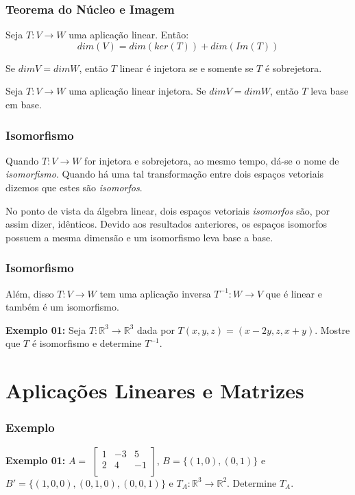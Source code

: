 \documentclass[hyperref={pdfpagelabels=false}]{beamer}
\begin{document}
\begin{frame}
\frametitle{Teorema do Núcleo e Imagem}

\begin{theorem}
	Seja $T:V \rightarrow W$ uma aplicação linear. Então:
	$$dim(V) = dim(ker(T)) + dim(Im(T))$$
\end{theorem}
\pause
\begin{corollary}
	Se $dimV = dimW$, então $T$ linear é injetora se e somente se $T$ é sobrejetora.
\end{corollary}
\pause
\begin{corollary}
	Seja $T:V \rightarrow W$ uma aplicação linear injetora. Se $dimV = dimW$, então $T$ leva base em base.
\end{corollary}

\end{frame}

\begin{frame}
\frametitle{Isomorfismo}

Quando $T: V \rightarrow W$ for injetora e sobrejetora, ao mesmo tempo, dá-se o nome de \emph{isomorfismo}. Quando há uma tal transformação entre dois espaços vetoriais dizemos que estes são \emph{isomorfos}. 

\pause

No ponto de vista da álgebra linear, dois espaços vetoriais \emph{isomorfos} são, por assim dizer, idênticos. Devido aos resultados anteriores, os espaços isomorfos possuem a mesma dimensão e um isomorfismo leva base a base.

\end{frame}

\begin{frame}
\frametitle{Isomorfismo} 

Além, disso $T: V \rightarrow W$ tem uma aplicação inversa $T^{-1}:W \rightarrow V$ que é linear e também é um isomorfismo.

{\bf Exemplo 01: } Seja $T: \mathbb{R}^{3} \rightarrow \mathbb{R}^{3}$ dada por $T(x,y,z) = (x - 2y,z, x+y)$. Mostre que $T$ é isomorfismo e determine $T^{-1}$.

\end{frame}

\section{Aplicações Lineares e Matrizes}

\begin{frame}
\frametitle{Exemplo}

{\bf Exemplo 01: } $A = $ $\left[
\begin{array}{ccc}
1	&	-3	&	5 \\
2	&	4	&	-1	\\
\end{array}
\right]$, $B = \{ (1,0), (0,1) \}$ e $B' = \{ (1,0,0), (0,1,0), (0,0,1) \}$ e $T_A : \mathbb{R}^3 \rightarrow \mathbb{R}^2$. Determine $T_A$.

\end{frame}
\end{document}
